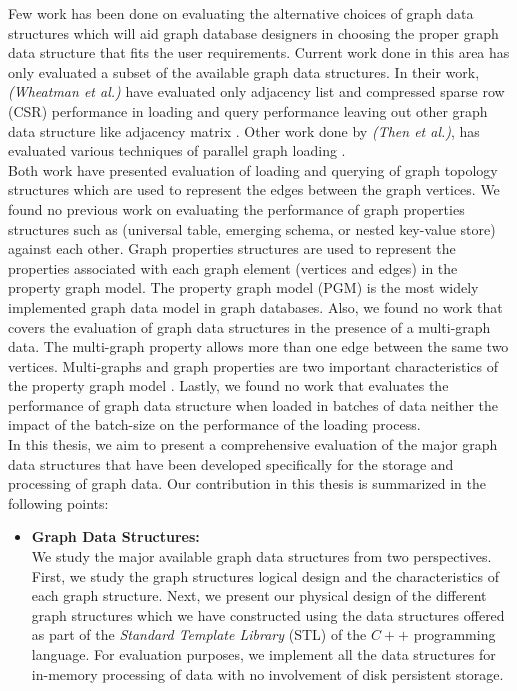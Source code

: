{Few work has been done on evaluating the alternative choices of graph data structures which will aid graph database designers in choosing the proper graph data structure that fits the user requirements. Current work done in this area has only evaluated a subset of the available graph data structures. In their work, \textit{(Wheatman et al.)} have evaluated only adjacency list and compressed sparse row (CSR) performance in loading and query performance leaving out other graph data structure like adjacency matrix \cite{wheatmanpacked}. Other work done by \textit{(Then et al.)}, has evaluated various techniques of parallel graph loading \cite{then2016evaluation}. \\

Both work \cite{wheatmanpacked, then2016evaluation} have presented evaluation of loading and querying of graph topology structures which are used to represent the edges between the graph vertices. We found no previous work on evaluating the performance of graph properties structures such as (universal table, emerging schema, or nested key-value store) against each other. Graph properties structures are used to represent the properties associated with each graph element (vertices and edges) in the property graph model. The property graph model (PGM) is the most widely implemented graph data model in graph databases. Also, we found no work that covers the evaluation of graph data structures in the presence of a multi-graph data. The multi-graph property allows more than one edge between the same two vertices. Multi-graphs and graph properties are two important characteristics of the property graph model \cite{robinson2013graph}. Lastly, we found no work that evaluates the performance of graph data structure when loaded in batches of data neither the impact of the batch-size on the performance of the loading process.\\




In this thesis, we aim to present a comprehensive evaluation of the major graph data structures that have been developed specifically for the storage and processing of graph data. Our contribution in this thesis is summarized in the following points:


\begin{itemize}  
\item\textbf{Graph Data Structures:}\\
We study the major available graph data structures from two perspectives. First, we study the graph structures logical design and the characteristics of each graph structure. Next, we present our physical design of the different graph structures which we have constructed using the data structures offered as part of the \textit{Standard Template Library} (STL) of the $C++$ programming language. For evaluation purposes, we implement all the data structures for in-memory processing of data with no involvement of disk persistent storage.\\


\end{itemize}}
